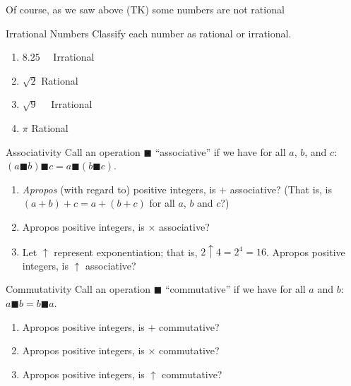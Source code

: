 \documentclass[12pt,a4paper]{report}
\begin{document}
Of course, as we saw above (TK) some numbers are not rational

\begin{problem}{Irrational Numbers}
 Classify each number as rational or irrational.

 \begin{enumerate}[\hspace{.5cm}a.]
  \item $8.25$ \hfill {}~~Irrational
  \item $\sqrt{2}$ \hfill Rational~~
  \item $\sqrt{9}$ \hfill {}~~Irrational
  \item $\pi$ \hfill Rational~~
 \end{enumerate}
\end{problem}

\begin{problem}{Associativity}
 Call an operation $\blacksquare$ ``associative'' if we have for all $a$, $b$,
 and $c$: $(a \blacksquare b) \blacksquare c = a \blacksquare (b \blacksquare
 c)$.

 \begin{enumerate}[\hspace{.5cm}a.]
  \item \emph{Apropos} (with regard to) positive integers, is $+$ associative?
  (That is, is $(a+b)+c=a+(b+c)$ for all $a$, $b$ and $c$?) 
  \item Apropos positive integers, is $\times$ associative? 
  \item Let $\uparrow$ represent exponentiation; that is, $2\uparrow4=2^4=16$.
  Apropos positive integers, is $\uparrow$ associative? 
 \end{enumerate}
\end{problem}

\begin{problem}{Commutativity}
 Call an operation $\blacksquare$ ``commutative'' if we have for all $a$ and
 $b$: $a \blacksquare b = b \blacksquare a$.

 \begin{enumerate}[\hspace{.5cm}a.]
  \item Apropos positive integers, is $+$ commutative? 
  \item Apropos positive integers, is $\times$ commutative? 
  \item Apropos positive integers, is $\uparrow$ commutative? 
 \end{enumerate}
\end{problem}
\end{document}
